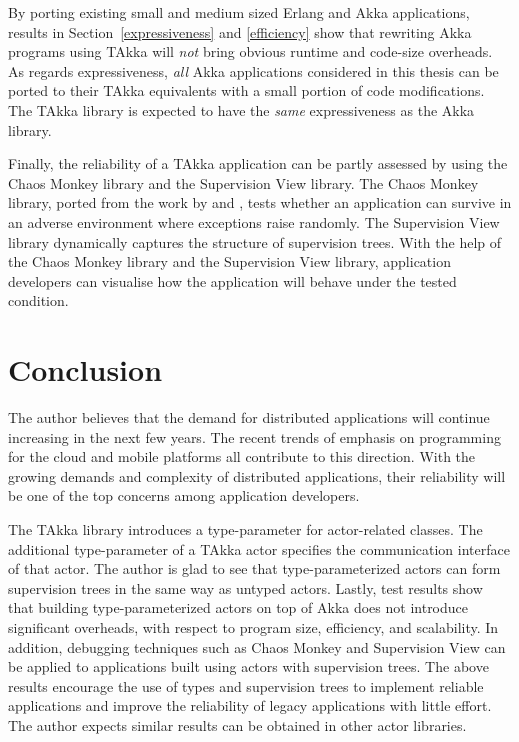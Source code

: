 By porting existing small and medium sized Erlang and Akka applications, 
results in Section~\ref{expressiveness} and \ref{efficiency} show that 
rewriting Akka programs using TAkka will {\it not} bring obvious runtime and 
code-size overheads. As regards expressiveness, {\it all} Akka applications 
considered in this thesis can be ported to their TAkka equivalents with a small 
portion of code modifications.  The TAkka library is expected to have the {\it 
same} expressiveness as the Akka library.

Finally, the reliability of a TAkka application can be partly assessed by using
the Chaos Monkey library and the Supervision View library.  
The Chaos Monkey library, ported from the work by \citet{ChaosMonkey} and 
\citet{ErlangChaosMonkey}, tests whether an application can survive in an 
adverse environment where exceptions raise randomly.  The Supervision View 
library dynamically captures the structure of supervision trees.  With the help 
of the Chaos Monkey library and the Supervision View library, application 
developers can visualise how the application will behave under the tested 
condition.



\section{Conclusion}

The author believes that the demand for distributed applications will continue 
increasing in the next few years.  The recent trends of emphasis on programming 
for the cloud and mobile platforms all contribute to this direction.  With the 
growing demands and complexity of distributed applications, their reliability 
will be one of the top concerns among application developers. 

The TAkka library introduces a type-parameter for actor-related classes. The 
additional type-parameter of a TAkka actor specifies the communication 
interface of that actor.  The author is glad to see that type-parameterized 
actors can form supervision trees in the same way as untyped actors.
Lastly, test results show that building type-parameterized actors on top of 
Akka does not introduce significant overheads, with respect to program size,
efficiency, and scalability.  In addition, debugging techniques such 
as Chaos Monkey and Supervision View can be applied to applications built 
using actors with supervision trees.  The above results encourage the use of 
types and supervision trees to implement reliable applications and improve the 
reliability of legacy applications with little effort.  The author expects 
similar results can be obtained in other actor libraries.




